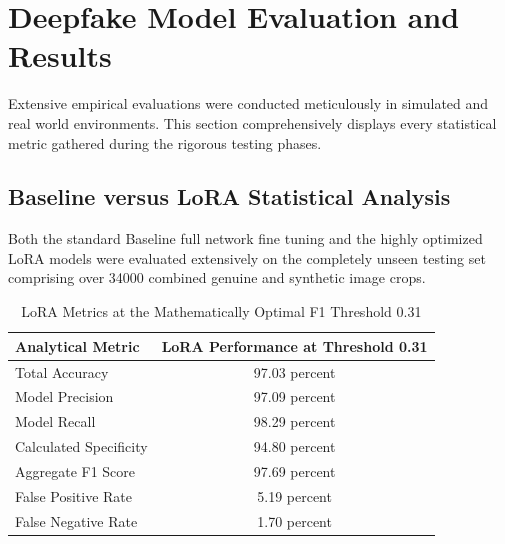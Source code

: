 \documentclass[12pt,a4paper]{report}
\begin{document}
\chapter{Deepfake Model Evaluation and Results}
Extensive empirical evaluations were conducted meticulously in simulated and real world environments. This section comprehensively displays every statistical metric gathered during the rigorous testing phases.

\section{Baseline versus LoRA Statistical Analysis}
Both the standard Baseline full network fine tuning and the highly optimized LoRA models were evaluated extensively on the completely unseen testing set comprising over 34000 combined genuine and synthetic image crops. 

\begin{table}[H]
\centering
\caption{Comparative Metrics at Standard Probability Threshold 0.50}
\label{tab:comp_standard}
\end{table}

\begin{table}[H]
\centering
\caption{LoRA Metrics at the Mathematically Optimal F1 Threshold 0.31}
\label{tab:lora_optimal}
\begin{tabular}{@{}lc@{}}
\toprule
\textbf{Analytical Metric} & \textbf{LoRA Performance at Threshold 0.31} \\ \midrule
Total Accuracy & 97.03 percent \\
Model Precision & 97.09 percent \\
Model Recall & 98.29 percent \\
Calculated Specificity & 94.80 percent \\
Aggregate F1 Score & 97.69 percent \\
False Positive Rate & 5.19 percent \\
False Negative Rate & 1.70 percent \\ \bottomrule
\end{tabular}
\end{table}
\end{document}
